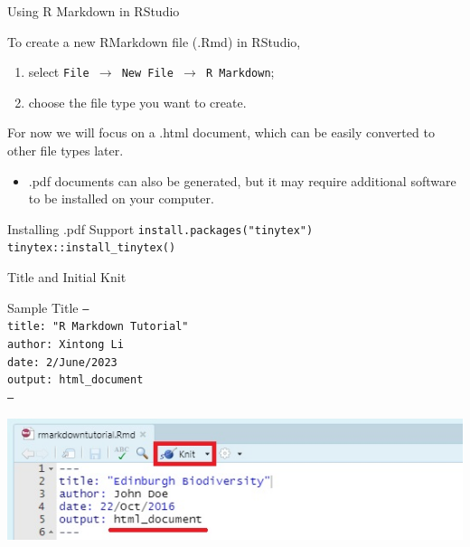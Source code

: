 \documentclass[9pt,handout]{beamer}
\newcommand{\skipv}{\vspace{8pt}}
\begin{document}
\begin{frame}{Using R Markdown in RStudio}

    To create a new RMarkdown file (.Rmd) in RStudio,  
    \skipv
    \begin{enumerate}
        \item   select \texttt{File $\rightarrow$ New File $\rightarrow$ R Markdown};
        \skipv
        \item   choose the file type you want to create.
    \end{enumerate}
    \skipv
    For now we will focus on a .html document, which can be easily converted to other file types later.
    \begin{itemize}
        \item  .pdf documents can also be generated, but it may require additional software to be installed on your computer.
    \end{itemize}
    \begin{block}{Installing .pdf Support}
        \quad \texttt{install.packages("tinytex")} \\
        \quad \texttt{tinytex::install\_tinytex()} 
    \end{block}

\end{frame}

\begin{frame}{Title and Initial Knit}

    \begin{block}{Sample Title}
        \quad \texttt{---} \\ 
        \quad \texttt{title: "R Markdown Tutorial"} \\
        \quad \texttt{author: Xintong Li} \\ 
        \quad \texttt{date: 2/June/2023} \\ 
        \quad \texttt{output: html\_document} \\
        \quad \texttt{---} \\
    \end{block}
    \skipv

    \includegraphics[width=\textwidth]{Knit.jpeg}

\end{frame}
\end{document}
